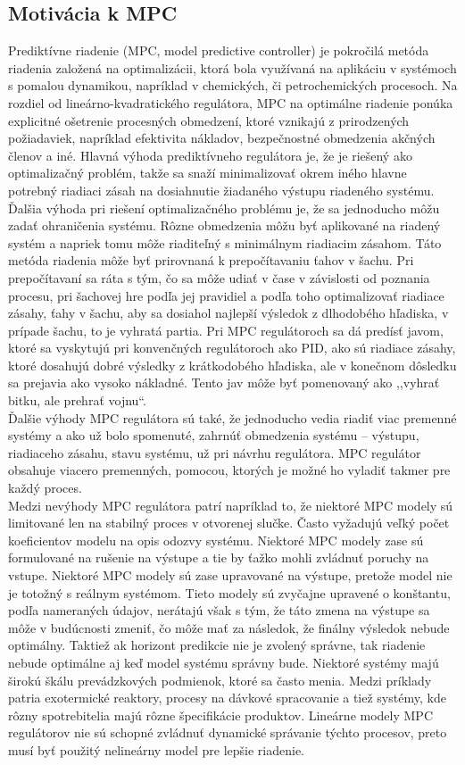 \subsection*{Motivácia k MPC}
Prediktívne riadenie (MPC, model predictive controller) je pokročilá metóda riadenia založená na optimalizácii, ktorá bola využívaná na aplikáciu v systémoch s pomalou dynamikou, napríklad v chemických, či petrochemických procesoch. Na rozdiel od lineárno-kvadratického regulátora, MPC na optimálne riadenie ponúka explicitné ošetrenie procesných obmedzení, ktoré vznikajú z prirodzených požiadaviek, napríklad efektivita nákladov, bezpečnostné obmedzenia akčných členov a iné.\cite{MPC01} \newline
\indent Hlavná výhoda prediktívneho regulátora je, že je riešený ako optimalizačný problém, takže sa snaží minimalizovať okrem iného hlavne potrebný riadiaci zásah na dosiahnutie žiadaného výstupu riadeného systému. Ďalšia výhoda pri riešení optimalizačného problému je, že sa jednoducho môžu zadať ohraničenia systému. Rôzne obmedzenia môžu byť aplikované na riadený systém a napriek tomu môže riaditeľný s minimálnym riadiacim zásahom. Táto metóda riadenia môže byť prirovnaná k prepočítavaniu ťahov v šachu. Pri prepočítavaní sa ráta s tým, čo sa môže udiať v čase v závislosti od poznania procesu, pri šachovej hre podľa jej pravidiel a podľa toho optimalizovať riadiace zásahy, ťahy v šachu, aby sa dosiahol najlepší výsledok z dlhodobého hľadiska, v prípade šachu, to je vyhratá partia. Pri MPC regulátoroch sa dá predísť javom, ktoré sa vyskytujú pri konvenčných regulátoroch ako PID, ako sú riadiace zásahy, ktoré dosahujú dobré výsledky z krátkodobého hľadiska, ale v konečnom dôsledku sa prejavia ako vysoko nákladné. Tento jav môže byť pomenovaný ako ,,vyhrať bitku, ale prehrať vojnu``. \\ 
\indent Ďalšie výhody MPC regulátora sú také, že jednoducho vedia riadiť viac premenné systémy a ako už bolo spomenuté, zahrnúť obmedzenia systému – výstupu, riadiaceho zásahu, stavu systému, už pri návrhu regulátora. MPC regulátor obsahuje viacero premenných, pomocou, ktorých je možné ho vyladiť takmer pre každý proces. \\
\indent Medzi nevýhody MPC regulátora patrí napríklad to, že niektoré MPC modely sú limitované len na stabilný proces v otvorenej slučke. Často vyžadujú veľký počet koeficientov modelu na opis odozvy systému. Niektoré MPC modely zase sú formulované na  rušenie na výstupe a tie by ťažko mohli zvládnuť poruchy na vstupe. Niektoré MPC modely sú zase upravované na výstupe, pretože model nie je totožný s reálnym systémom. Tieto modely sú zvyčajne upravené o konštantu, podľa nameraných údajov, nerátajú však s tým, že táto zmena na výstupe sa môže v budúcnosti zmeniť, čo môže mať za následok, že finálny výsledok nebude optimálny. Taktiež ak horizont predikcie nie je zvolený správne, tak riadenie nebude optimálne aj keď model systému správny bude. Niektoré systémy majú širokú škálu prevádzkových podmienok, ktoré sa často menia. Medzi príklady patria exotermické reaktory, procesy na dávkové spracovanie a tiež systémy, kde rôzny spotrebitelia majú rôzne špecifikácie produktov. Lineárne modely MPC regulátorov nie sú schopné zvládnuť dynamické správanie týchto procesov, preto musí byť použitý nelineárny model pre lepšie riadenie.\cite{MPC02} 
